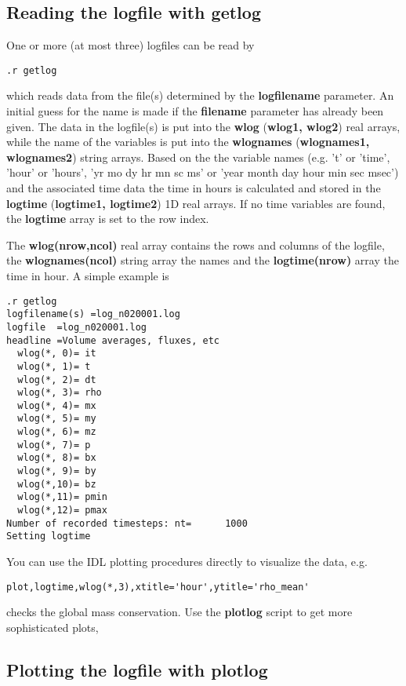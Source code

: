 \subsection{Reading the logfile with getlog \label{s-getlog}}

One or more (at most three) logfiles can be read by
\begin{verbatim}
.r getlog
\end{verbatim}
   which reads data from the file(s) determined by the {\bf logfilename} 
   parameter. An initial guess for the name is made if the 
   {\bf filename} parameter has already been given. The data in the
   logfile(s) is put into the {\bf wlog} ({\bf wlog1, wlog2}) real arrays,
   while the name of the variables is put into the {\bf wlognames} 
   ({\bf wlognames1, wlognames2}) string arrays. Based on the
   the variable names (e.g. 't' or 'time', 'hour' or 'hours',
   'yr mo dy hr mn sc ms' or 'year month day hour min sec msec') 
   and the associated time data the time in hours is calculated 
   and stored in the {\bf logtime} ({\bf logtime1, logtime2}) 1D real arrays. 
   If no time variables are found, the {\bf logtime} array is set to the
   row index.

   The {\bf wlog(nrow,ncol)} real array contains the rows and columns of the
   logfile, the {\bf wlognames(ncol)} string array the names and the
   {\bf logtime(nrow)} array the time in hour. A simple example is 
\begin{verbatim}
.r getlog
logfilename(s) =log_n020001.log
logfile  =log_n020001.log
headline =Volume averages, fluxes, etc
  wlog(*, 0)= it
  wlog(*, 1)= t
  wlog(*, 2)= dt
  wlog(*, 3)= rho
  wlog(*, 4)= mx
  wlog(*, 5)= my
  wlog(*, 6)= mz
  wlog(*, 7)= p
  wlog(*, 8)= bx
  wlog(*, 9)= by
  wlog(*,10)= bz
  wlog(*,11)= pmin
  wlog(*,12)= pmax
Number of recorded timesteps: nt=      1000
Setting logtime
\end{verbatim}
You can use the IDL plotting procedures directly to visualize the data, e.g.
\begin{verbatim}
plot,logtime,wlog(*,3),xtitle='hour',ytitle='rho_mean'
\end{verbatim}
checks the global mass conservation. 
Use the {\bf plotlog} script to get more sophisticated plots,

\subsection{Plotting the logfile with plotlog \label{s-plotlog}}

